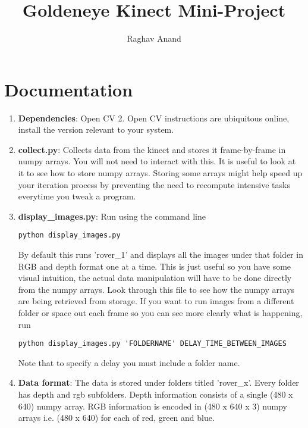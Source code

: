 \documentclass[a4paper]{article}
\title{Goldeneye Kinect Mini-Project}
\author{Raghav Anand}
\begin{document}
\maketitle

\section{Documentation}
\begin{enumerate}
  \item 
    \textbf{Dependencies}: Open CV 2. Open CV instructions are ubiquitous online, install the version relevant to your system. 
  \item
    \textbf{collect.py}: Collects data from the kinect and stores it frame-by-frame in numpy arrays. You will not need to interact with this. It is useful to look at it to see how to store numpy arrays. Storing some arrays might help speed up your iteration process by preventing the need to recompute intensive tasks everytime you tweak a program.

  \item
    \textbf{display\_images.py}: Run using the command line 
    \begin{lstlisting}[breaklines]
    python display_images.py 
    \end{lstlisting} 
    By default this runs 'rover\_1' and displays all the images under that folder in RGB and depth format one at a time. This is just useful so you have some visual intuition, the actual data manipulation will have to be done directly from the numpy arrays. Look through this file to see how the numpy arrays are being retrieved from storage. If you want to run images from a different folder or space out each frame so you can see more clearly what is happening, run 
    \begin{lstlisting}[breaklines]
    python display_images.py 'FOLDERNAME' DELAY_TIME_BETWEEN_IMAGES
    \end{lstlisting}
    Note that to specify a delay you must include a folder name. 

\item 
  \textbf{Data format}: The data is stored under folders titled 'rover\_x'. Every folder has depth and rgb subfolders. Depth information consists of a single (480 x 640) numpy array. RGB information is encoded in (480 x 640 x 3) numpy arrays i.e. (480 x 640) for each of red, green and blue.

\end{enumerate}
\end{document}
